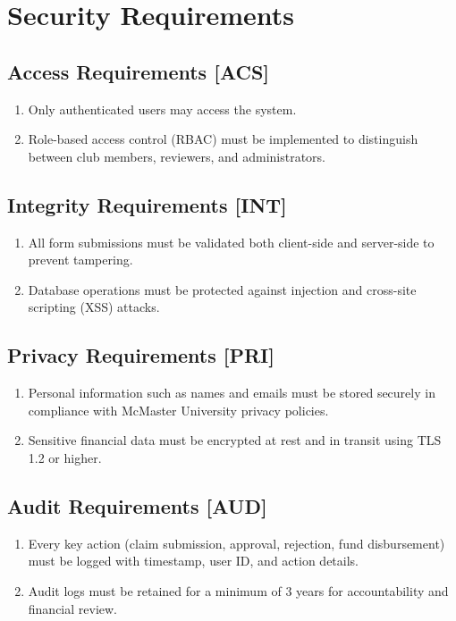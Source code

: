\documentclass[12pt]{article}
\begin{document}
\section{Security Requirements}

\subsection{Access Requirements [ACS]}
\begin{enumerate}
    \item Only authenticated users may access the system.
    \item Role-based access control (RBAC) must be implemented to distinguish between club members, reviewers, and administrators.
\end{enumerate}

\subsection{Integrity Requirements [INT]}
\begin{enumerate}
    \item All form submissions must be validated both client-side and server-side to prevent tampering.
    \item Database operations must be protected against injection and cross-site scripting (XSS) attacks.
\end{enumerate}

\subsection{Privacy Requirements [PRI]}
\begin{enumerate}
    \item Personal information such as names and emails must be stored securely in compliance with McMaster University privacy policies.
    \item Sensitive financial data must be encrypted at rest and in transit using TLS 1.2 or higher.
\end{enumerate}

\subsection{Audit Requirements [AUD]}
\begin{enumerate}
    \item Every key action (claim submission, approval, rejection, fund disbursement) must be logged with timestamp, user ID, and action details.
    \item Audit logs must be retained for a minimum of 3 years for accountability and financial review.
\end{enumerate}
\end{document}
